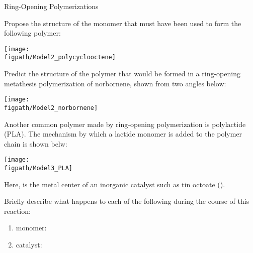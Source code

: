 \begin{activity}{Ring-Opening Polymerizations}
\begin{ctqs}
				\begin{solution}[0.5in]
				\end{solution}
	
	\clearpage
	\question Propose the structure of the monomer that must have been used to form the following polymer:
	
	\centerline{\texttt{[image: \\figpath/Model2\_polycyclooctene]}}
			
				\begin{solution}[1in]
				\end{solution}
	
	\question Predict the structure of the polymer that would be formed in a ring-opening metathesis polymerization of norbornene, shown from two angles below:
	
	\centerline{\texttt{[image: \\figpath/Model2\_norbornene]}}
			
				\begin{solution}[1in]
				\end{solution}
	
\end{ctqs}


\begin{model}[Polylactide]
	\label{\labelbase:mdl:PLA}

	Another common polymer made by ring-opening polymerization is polylactide (PLA).  The mechanism by which a lactide monomer is added to the polymer chain is shown belw:
	
	\centerline{\texttt{[image: \\figpath/Model3\_PLA]}}
	
	Here, \ce{[M]} is the metal center of an inorganic catalyst such as tin octoate ().
	
\end{model}

\begin{ctqs}
	
	\question Briefly describe what happens to each of the following during the course of this reaction:
	
		\begin{enumerate}
			\item monomer:
			
				\begin{solution}[0.5in]
				\end{solution}
			
			\item catalyst:
			
				\begin{solution}[0.5in]
				\end{solution}
				

\end{enumerate}
\end{ctqs}
\end{activity}
